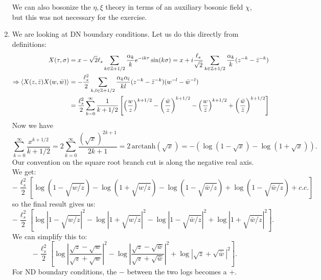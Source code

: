 \documentclass[11pt]{article}
\begin{document}
\begin{enumerate}
	We can also bosonize the $\eta, \xi$ theory in terms of an auxiliary bosonic field $\chi$, but this was not necessary for the exercise. 
	
	\item We are looking at DN boundary conditions. Let us do this directly from definitions:
	\[
	\begin{aligned}
		X(\tau, \sigma) &= x - \sqrt{2} \ell_s \sum_{k \in \mathbb Z + 1/2} \frac{\alpha_k}{k} e^{-i k \tau} \sin(k \sigma) = x + i \frac{\ell_s}{\sqrt 2} \sum_{k \in \mathbb Z + 1/2} \frac{\alpha_k}{k} (z^{-k} - \bar z^{-k})\\
		\Rightarrow \braket{X(z, \bar z) X(w, \bar w)} &= -\frac{\ell_s^2}{2} \sum_{k, l \in \mathbb Z + 1/2} \frac{\alpha_{k} \alpha_l}{k l} (z^{-k} - \bar z^{-k}) (w^{-l} - \bar w^{-l})\\
		&= \frac{\ell_s^2}{2} \sum_{k = 0}^\infty \frac{1}{k+1/2} \left[ \left(\frac{w}{z} \right)^{k+1/2} - \left(\frac{\bar w}{z} \right)^{k+1/2} - \left(\frac{w}{\bar z} \right)^{k+1/2} + \left(\frac{\bar w}{\bar z} \right)^{k+1/2} \right]
	\end{aligned}
	\]
	Now we have \[
		\sum_{k=0}^\infty \frac{x^{k+1/2}}{k+1/2} = 2 \sum_{k=0}^\infty \frac{(\sqrt x)^{2k+1}}{2k+1} = 2\, \mathrm{arctanh}(\sqrt{x}) = - ( \log(1-\sqrt x) - \log(1+\sqrt x)).
	\]
	Our convention on the square root branch cut is along the negative real axis. We get:
	\[
		-\frac{\ell_s^2}{2} \left[\log(1 - \sqrt{w/z}) - \log(1 + \sqrt{w/z})  - \log(1 - \sqrt{\bar w/z}) + \log(1 - \sqrt{\bar w/z}) + c.c. \right]
	\]
	so the final result gives us:
	\[
		- \frac{\ell_s^2}{2} \left[ \log|1 - \sqrt{w/z}|^2 - \log|1 + \sqrt{w/z}|^2 - \log|1 - \sqrt{\bar w/z}|^2 +  \log|1 + \sqrt{\bar w/z}|^2 \right].
	\]
	We can simplify this to:
	\[
		- \frac{\ell_s^2}{2} \left[ \log|\frac{\sqrt{z} - \sqrt{w}}{\sqrt{z} + \sqrt{w}}|^2 - \log|\frac{\sqrt{z} - \sqrt{\bar w}}{\sqrt z + \sqrt{\bar w}}|^2 + \log|\sqrt{z} + \sqrt{\bar w}|^2 \right].
	\]
	For ND boundary conditions, the $-$ between the two logs becomes a $+$.
	

\end{enumerate}
\end{document}

